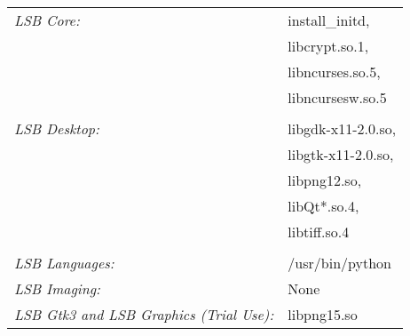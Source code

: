 \documentclass{book}
\begin{document}
\begin{LTR} 

	\vspace{0.1cm}

	\begin{tabular}{@{} l l @{}}
		\textit{LSB Core:} & install\_initd,\\ 
					& libcrypt.so.1,\\
					& libncurses.so.5,\\
					& libncursesw.so.5\\
					\\
		\textit{LSB Desktop:} & libgdk-x11-2.0.so,\\
						&  libgtk-x11-2.0.so,\\
						& libpng12.so,\\
						& libQt*.so.4,\\
						& libtiff.so.4\\
						\\
		\textit{LSB Languages:} & /usr/bin/python \\
		\textit{LSB Imaging:} & None\\
		\textit{LSB Gtk3 and LSB Graphics (Trial Use):} & libpng15.so \\
	\end{tabular}

\end{LTR}

\vspace{0.5cm}
\end{document}
